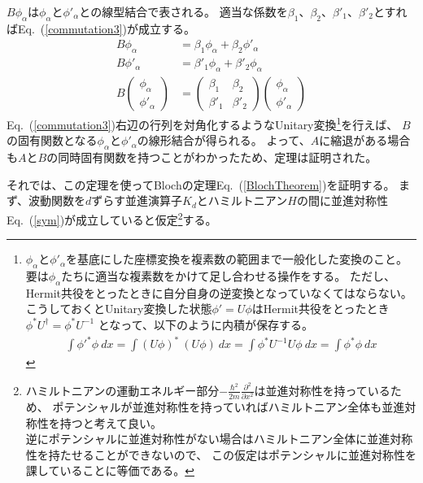 \documentclass[autodetect-engine,dvipdfmx-if-dvi,ja=standard,a4paper,layout=v2]{bxjsreport}
\newcommand{\eref}[1]{Eq.~(\ref{#1})}
\begin{document}
    $B\phi_\alpha$は$\phi_\alpha$と$\phi'_\alpha$との線型結合で表される。
    適当な係数を$\beta_1$、$\beta_2$、$\beta'_1$、$\beta'_2$とすれば\eref{commutation3}が成立する。\begin{align}
      B\phi_\alpha &= \beta_1\phi_\alpha + \beta_2\phi'_\alpha\nonumber\\
      B\phi'_\alpha &= \beta'_1\phi_\alpha + \beta'_2\phi_\alpha\nonumber\\
      B\begin{pmatrix}
      \phi_\alpha\\
      \phi'_\alpha
      \end{pmatrix}&=
      \begin{pmatrix}
      \beta_1 &\beta_2\\
      \beta'_1 & \beta'_2
      \end{pmatrix}
      \begin{pmatrix}
      \phi_\alpha\\
      \phi'_\alpha
      \end{pmatrix}\label{commutation3}
    \end{align}
    \eref{commutation3}右辺の行列を対角化するようなUnitary変換\footnote{
        $\phi_\alpha$と$\phi'_\alpha$を基底にした座標変換を複素数の範囲まで一般化した変換のこと。\\
        要は$\phi_\alpha$たちに適当な複素数をかけて足し合わせる操作をする。
        ただし、Hermit共役をとったときに自分自身の逆変換となっていなくてはならない。
        こうしておくとUnitary変換した状態$\phi'=U\phi$はHermit共役をとったとき$\phi^*U^\dagger=\phi^*U^{-1}$
        となって、以下のように内積が保存する。
        \begin{align}
        \int\phi'^*\phi\:dx=\int(U\phi)^*\:(U\phi)\:dx=\int\phi^*U^{-1}U\phi\:dx=\int\phi^*\phi\:dx\nonumber
        \end{align}
    }を行えば、
    $B$の固有関数となる$\phi_\alpha$と$\phi'_\alpha$の線形結合が得られる。
    よって、$A$に縮退がある場合も$A$と$B$の同時固有関数を持つことがわかったため、定理は証明された。\par
    それでは、この定理を使ってBlochの定理\eref{BlochTheorem}を証明する。
    まず、波動関数を$d$ずらす並進演算子$K_d$とハミルトニアン$H$の間に並進対称性\eref{sym}が成立していると仮定\footnote{
    ハミルトニアンの運動エネルギー部分$-\frac{\hbar^2}{2m}\frac{\partial^2}{\partial x^2}$は並進対称性を持っているため、
    ポテンシャルが並進対称性を持っていればハミルトニアン全体も並進対称性を持つと考えて良い。\\
    逆にポテンシャルに並進対称性がない場合はハミルトニアン全体に並進対称性を持たせることができないので、
    この仮定はポテンシャルに並進対称性を課していることに等価である。
}する。
\end{document}
